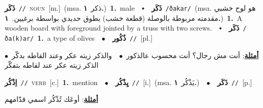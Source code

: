 \documentclass[10pt,a4paper,twoside]{article} %
\begin{document}
\begin{multicols}{2}
{{{{{\setlength\topsep{0pt}\textbf{\foreignlanguage{arabic}{ذَكَر}}\ {\color{gray}\texttt{//}\color{black}}\ \textsc{noun}\ [m.]\ \color{gray}(msa. \foreignlanguage{arabic}{ذكر}~\foreignlanguage{arabic}{\textbf{١.}})\color{black}\ \textbf{1.}~male\ \ $\smblkdiamond$\ \ \setlength\topsep{0pt}\textbf{\foreignlanguage{arabic}{ذَكَر}}\ {\color{gray}\texttt{/ðakar/}\color{black}}\ \color{gray}(msa. \foreignlanguage{arabic}{هو لوح خشبي مقدمته مربوطة بالوصلة (قطعة خشب) بطوق حديدي بواسطة برغيين.}~\foreignlanguage{arabic}{\textbf{١.}})\color{black}\ \textbf{1.}~A wooden board with foreground jointed by a truss with two screws.\ \ $\smblkdiamond$\ \ \setlength\topsep{0pt}\textbf{\foreignlanguage{arabic}{ذَكَر}}\ {\color{gray}\texttt{/ða(k)ar/}\color{black}}\ \textbf{1.}~a type of olives\ \ $\bullet$\ \ \setlength\topsep{0pt}\textbf{\foreignlanguage{arabic}{ذُكُور}}\ {\color{gray}\texttt{//}\color{black}}\ [pl.]\  \begin{flushright}\color{gray}\foreignlanguage{arabic}{\textbf{\underline{\foreignlanguage{arabic}{أمثلة}}}: أنت مش رجال؟ أنت محسوب عالذكور\ $\bullet$\ \  والذكر زيته عكر وعند القاطه بدكّر\ $\bullet$\ \  الذكر زيته عكر عند لقاطه بتفكّر}\end{flushright}\color{black}} \vspace{2mm}

{\setlength\topsep{0pt}\textbf{\foreignlanguage{arabic}{اِذْكُر}}\ {\color{gray}\texttt{//}\color{black}}\ \textsc{verb}\ [c.]\ \textbf{1.}~mention\ \ $\bullet$\ \ \setlength\topsep{0pt}\textbf{\foreignlanguage{arabic}{يِذْكُر}}\ {\color{gray}\texttt{//}\color{black}}\ [i.]\ \color{gray}(msa. \foreignlanguage{arabic}{يَذْكُر}~\foreignlanguage{arabic}{\textbf{١.}})\color{black}\ \ $\bullet$\ \ \setlength\topsep{0pt}\textbf{\foreignlanguage{arabic}{ذَكَر}}\ {\color{gray}\texttt{//}\color{black}}\ [p.]\  \begin{flushright}\color{gray}\foreignlanguage{arabic}{\textbf{\underline{\foreignlanguage{arabic}{أمثلة}}}: أوعَك تُذْكُر اسمي قدّامهم}\end{flushright}\color{black}} \vspace{2mm}

}}}}
\end{multicols}
\end{document}
